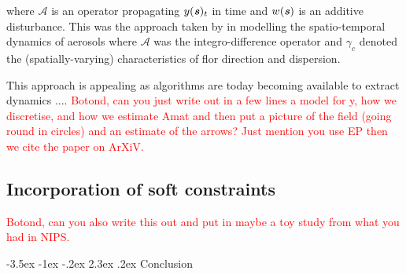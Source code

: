 \documentclass[10pt,a4paper]{article}
\makeatletter
\newcommand{\red}{\textcolor{red}}
\newcommand{\svec} {\textbf{\textit{s}}}
\renewcommand\section{\@startsection{section}{1}{\z@}%
                                  {-3.5ex \@plus -1ex \@minus -.2ex}%
                                  {2.3ex \@plus.2ex}%
                                  {\normalfont\large\bfseries}}
\makeatother
\begin{document}
\noindent where $\mathcal{A}$ is an operator propagating $y(\svec)_t$ in time and $w(\svec)$ is an additive disturbance. This was the approach taken by \cite{Calder_2011} in modelling the spatio-temporal dynamics of aerosols where $\mathcal{A}$ was the integro-difference operator \citep{Kot_1986} and $\gamma_c$ denoted the (spatially-varying) characteristics of flor direction and dispersion. 

This approach is appealing as algorithms are today becoming available to extract dynamics  .... \red{Botond, can you just write out in a few lines a model for y, how we discretise, and how we estimate Amat and then put a picture of the field (going round in circles) and an estimate of the arrows? Just mention you use EP then we cite the paper on ArXiV.}

\subsection{Incorporation of soft constraints}

\red{Botond, can you also write this out and put in maybe a toy study from what you had in NIPS.}




								


\section{Conclusion}


\end{document}
